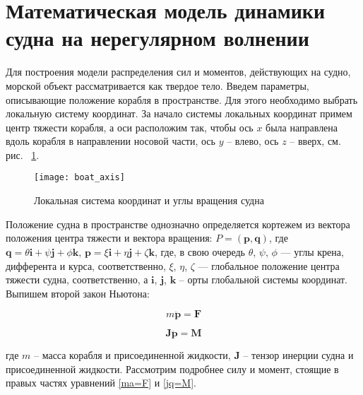 \section{Математическая модель динамики судна на нерегулярном волнении}
\label{math_ship}

Для построения модели распределения сил и моментов, действующих на судно, морской объект рассматривается как твердое тело. Введем параметры, описывающие положение корабля в пространстве. Для этого необходимо выбрать локальную систему координат. За начало системы локальных координат примем центр тяжести корабля, а оси расположим так, чтобы ось $x$ была направлена вдоль корабля в направлении носовой части, ось $y$ – влево, ось $z$ – вверх, см. рис. ~\ref{boat_axis}.

\begin{figure}[ht]
\begin{center}
\texttt{[image: boat\_axis]}
\end{center}
\caption{Локальная система координат и углы вращения судна}
\label{boat_axis}
\end{figure}

Положение судна в пространстве однозначно определяется кортежем из вектора положения центра тяжести и вектора вращения: 
$P=(\mathbf{p},\mathbf{q})$, 
где  
$\mathbf{q}=\theta \mathbf{i}+\psi \mathbf{j}+\phi \mathbf{k}$, 
$\mathbf{p}=\xi \mathbf{i}+\eta \mathbf{j}+\zeta \mathbf{k}$, 
где, в свою очередь $\theta$, $\psi$, $\phi$ --- углы крена, дифферента и курса, соответственно, 
 $\xi$, $\eta$, $\zeta$ --- глобальное положение центра тяжести судна, соответственно, 
а $\mathbf{i}$, $\mathbf{j}$, $\mathbf{k}$ – орты глобальной системы координат. Выпишем второй закон Ньютона:

\begin{equation}
	m \ddot{\mathbf{p}} = \mathbf{F}
	\label{ma=F}
\end{equation}

\begin{equation}
	\mathbf{J}  \ddot{\mathbf{p}} = \mathbf{M}
	\label{jq=M}
\end{equation}

где $m$ – масса корабля и присоединенной жидкости, $\mathbf{J}$ – тензор инерции судна и присоединенной жидкости. Рассмотрим подробнее силу и момент, стоящие в правых частях уравнений \eqref{ma=F} и \eqref{jq=M}. 

